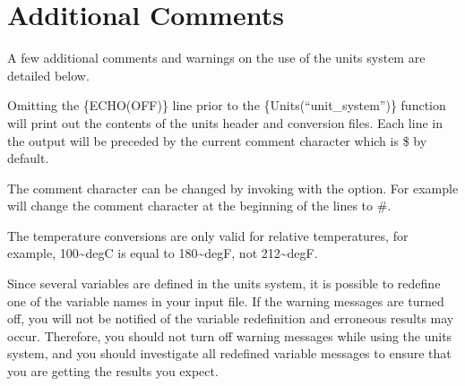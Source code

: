 \section{Additional Comments}

A few additional comments and warnings on the use of the units system are detailed
below.

Omitting the \{ECHO(OFF)\} line prior to the \{Units(``unit\_system'')\}
function will print out the contents of the units header and conversion files.
Each line in the output will be preceded by the current comment character which
is \$ by default.

The comment character can be changed by invoking \aprepro{} with the
 option. For example 
will change the comment character at the beginning of the lines to \#.

The temperature conversions are only valid for relative temperatures, for
example, 100\textasciitilde{}degC is equal to 180\textasciitilde{}degF, not 212\textasciitilde{}degF.

Since several variables are defined in the units system, it is
possible to redefine one of the variable names in your input file. If
the \aprepro{} warning messages are turned off, you will not be
notified of the variable redefinition and erroneous results may
occur. Therefore, you should not turn off \aprepro{} warning
messages while using the units system, and you should investigate all
redefined variable messages to ensure that you are getting the results
you expect.
